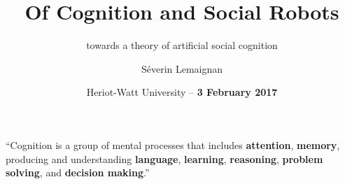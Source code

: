 \documentclass[compress]{beamer}
\title{Of Cognition and Social Robots}
\subtitle{towards a theory of artificial social cognition}
\date{Heriot-Watt University -- {\bf 3 February 2017}}
\author{Séverin Lemaignan}
\institute{Centre for Robotics and Neural Systems\\{\bf
Plymouth University}}
\begin{document}



\maketitle




\begin{frame}[plain]{}

        \LARGE

        ``Cognition is a group of mental processes that includes {\bf
        attention}, {\bf memory}, producing and understanding {\bf
        language}, {\bf learning}, {\bf reasoning}, {\bf problem
        solving}, and {\bf decision making}.''

\end{frame}

\end{document}
